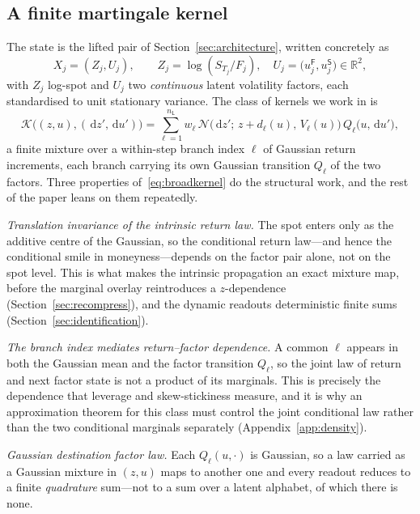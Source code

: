 \documentclass[11pt]{article}
\newcommand{\R}{\mathbb{R}}
\newcommand{\cK}{\mathcal{K}}
\newcommand{\cN}{\mathcal{N}}
\providecommand{\1}{\mathbf 1}
\newcommand{\dd}{\,\mathrm{d}}
\begin{document}
\subsection{A finite martingale kernel}

The state is the lifted pair of Section~\ref{sec:architecture}, written concretely as
\begin{equation}
X_j=(Z_j,U_j),\qquad Z_j=\log(S_{T_j}/F_j),\quad
U_j=\bigl(u^{\mathsf F}_j,u^{\mathsf S}_j\bigr)\in\R^{2},
\label{eq:kernel}
\end{equation}
with $Z_j$ log-spot and $U_j$ two \emph{continuous} latent volatility factors, each standardised to
unit stationary variance. The class of kernels we work in is
\begin{equation}\label{eq:broadkernel}
  \cK\bigl((z,u),(\dd z',\dd u')\bigr)
  =\sum_{\ell=1}^{n_{\mathsf L}} w_\ell\,
    \cN\bigl(\dd z';\,z+d_{\ell}(u),\,V_{\ell}(u)\bigr)\,
    Q_\ell\bigl(u,\dd u'\bigr),
\end{equation}
a finite mixture over a within-step branch index $\ell$ of Gaussian return increments, each branch
carrying its own Gaussian transition $Q_\ell$ of the two factors. Three properties
of~\eqref{eq:broadkernel} do the structural work, and the rest of the paper leans on them
repeatedly.

\emph{Translation invariance of the intrinsic return law.} The spot enters only as the additive
centre of the Gaussian, so the conditional return law---and hence the conditional smile in
moneyness---depends on the factor pair alone, not on the spot level. This is what makes the
intrinsic propagation an exact mixture map, before the marginal overlay reintroduces a
$z$-dependence (Section~\ref{sec:recompress}), and the dynamic readouts deterministic finite sums
(Section~\ref{sec:identification}).

\emph{The branch index mediates return--factor dependence.} A common $\ell$ appears in both the
Gaussian mean and the factor transition $Q_\ell$, so the joint law of return and next factor state
is not a product of its marginals. This is precisely the dependence that leverage and skew-stickiness
measure, and it is why an approximation theorem for this class must control the joint conditional
law rather than the two conditional marginals separately (Appendix~\ref{app:density}).

\emph{Gaussian destination factor law.} Each $Q_\ell(u,\cdot)$ is Gaussian, so a law carried as a
Gaussian mixture in $(z,u)$ maps to another one and every readout reduces to a finite
\emph{quadrature} sum---not to a sum over a latent alphabet, of which there is none.
\end{document}

